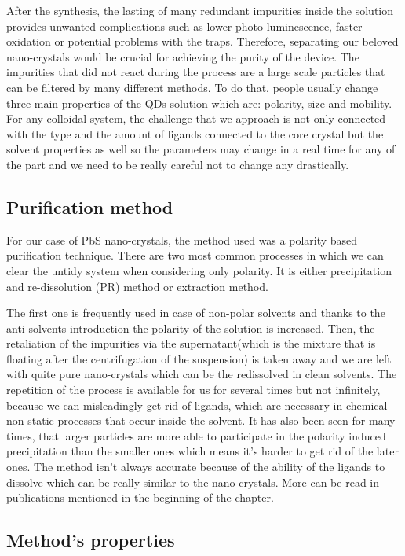 After the synthesis, the lasting of many redundant impurities inside the solution provides unwanted complications such as lower photo-luminescence, faster oxidation or potential problems with the traps. Therefore, separating our beloved nano-crystals would be crucial for achieving the purity of the device. The  impurities that did not react during the process are a large scale particles that can be  filtered by many different methods. \cite{Shen2017}\cite{purif} To do that, people usually change three main properties of the QDs solution which are: polarity, size and mobility. For any colloidal system, the challenge that we approach is not only connected with the type and the amount of ligands connected to the core crystal but the solvent properties as well so the parameters may change in a real time for any of the part and we need to be really careful not to change any drastically. 

\subsection{Purification method}

For our case of PbS nano-crystals, the method used was a polarity based purification technique. There are two most common processes in which we can clear the untidy system when considering only polarity. It is either precipitation and re-dissolution (PR) method or extraction method. 

The first one is frequently used in case of non-polar solvents and thanks to the anti-solvents introduction the polarity of the solution is increased. Then, the retaliation of the impurities via the supernatant(which is the mixture that is floating after the centrifugation of the suspension) is taken away and we are left with quite pure nano-crystals which can be the redissolved in clean solvents. The repetition of the process is available for us for several times but not infinitely, because we can misleadingly get rid of ligands, which are necessary in chemical non-static processes that occur inside the solvent. It has also been seen for many times, that larger particles are more able to participate in the polarity induced precipitation than the smaller ones which means it's harder to get rid of the later ones. The method isn't always accurate because of the ability of the ligands to dissolve which can be really similar to the nano-crystals. More can be read in publications mentioned in the beginning of the chapter.
\vline

\subsection{Method's properties}
\label{subsection:CHXpurification}

